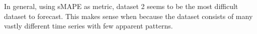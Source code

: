 
In general, using sMAPE as metric, dataset 2 seems to be the most difficult dataset to forecast.
This makes sense when because the dataset consists of many vastly different time series
with few apparent patterns.